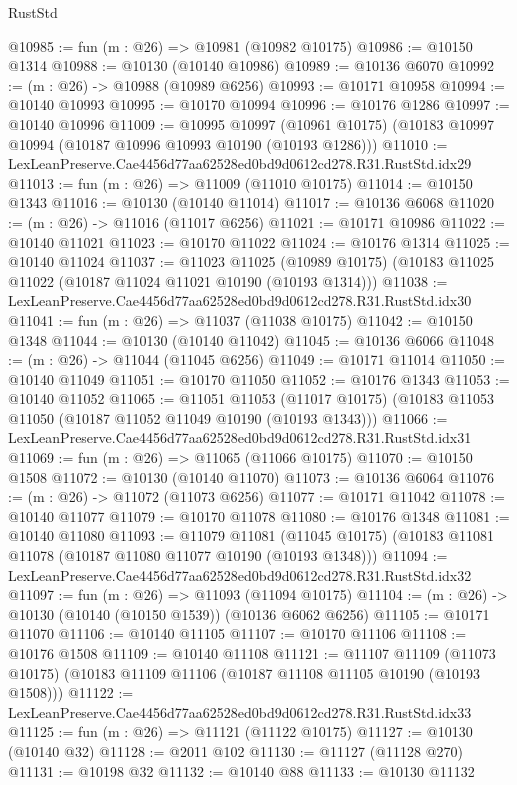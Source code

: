 \begin{lexlean}{RustStd}
\begin{coremodule}
@10985 := fun (m : @26) => @10981 (@10982 @10175)
@10986 := @10150 @1314
@10988 := @10130 (@10140 @10986)
@10989 := @10136 @6070
@10992 := (m : @26) -> @10988 (@10989 @6256)
@10993 := @10171 @10958
@10994 := @10140 @10993
@10995 := @10170 @10994
@10996 := @10176 @1286
@10997 := @10140 @10996
@11009 := @10995
    @10997
    (@10961 @10175)
    (@10183 @10997 @10994 (@10187 @10996 @10993 @10190 (@10193 @1286)))
@11010 := LexLeanPreserve.Cae4456d77aa62528ed0bd9d0612cd278.R31.RustStd.idx29
@11013 := fun (m : @26) => @11009 (@11010 @10175)
@11014 := @10150 @1343
@11016 := @10130 (@10140 @11014)
@11017 := @10136 @6068
@11020 := (m : @26) -> @11016 (@11017 @6256)
@11021 := @10171 @10986
@11022 := @10140 @11021
@11023 := @10170 @11022
@11024 := @10176 @1314
@11025 := @10140 @11024
@11037 := @11023
    @11025
    (@10989 @10175)
    (@10183 @11025 @11022 (@10187 @11024 @11021 @10190 (@10193 @1314)))
@11038 := LexLeanPreserve.Cae4456d77aa62528ed0bd9d0612cd278.R31.RustStd.idx30
@11041 := fun (m : @26) => @11037 (@11038 @10175)
@11042 := @10150 @1348
@11044 := @10130 (@10140 @11042)
@11045 := @10136 @6066
@11048 := (m : @26) -> @11044 (@11045 @6256)
@11049 := @10171 @11014
@11050 := @10140 @11049
@11051 := @10170 @11050
@11052 := @10176 @1343
@11053 := @10140 @11052
@11065 := @11051
    @11053
    (@11017 @10175)
    (@10183 @11053 @11050 (@10187 @11052 @11049 @10190 (@10193 @1343)))
@11066 := LexLeanPreserve.Cae4456d77aa62528ed0bd9d0612cd278.R31.RustStd.idx31
@11069 := fun (m : @26) => @11065 (@11066 @10175)
@11070 := @10150 @1508
@11072 := @10130 (@10140 @11070)
@11073 := @10136 @6064
@11076 := (m : @26) -> @11072 (@11073 @6256)
@11077 := @10171 @11042
@11078 := @10140 @11077
@11079 := @10170 @11078
@11080 := @10176 @1348
@11081 := @10140 @11080
@11093 := @11079
    @11081
    (@11045 @10175)
    (@10183 @11081 @11078 (@10187 @11080 @11077 @10190 (@10193 @1348)))
@11094 := LexLeanPreserve.Cae4456d77aa62528ed0bd9d0612cd278.R31.RustStd.idx32
@11097 := fun (m : @26) => @11093 (@11094 @10175)
@11104 := (m : @26) -> @10130 (@10140 (@10150 @1539)) (@10136 @6062 @6256)
@11105 := @10171 @11070
@11106 := @10140 @11105
@11107 := @10170 @11106
@11108 := @10176 @1508
@11109 := @10140 @11108
@11121 := @11107
    @11109
    (@11073 @10175)
    (@10183 @11109 @11106 (@10187 @11108 @11105 @10190 (@10193 @1508)))
@11122 := LexLeanPreserve.Cae4456d77aa62528ed0bd9d0612cd278.R31.RustStd.idx33
@11125 := fun (m : @26) => @11121 (@11122 @10175)
@11127 := @10130 (@10140 @32)
@11128 := @2011 @102
@11130 := @11127 (@11128 @270)
@11131 := @10198 @32
@11132 := @10140 @88
@11133 := @10130 @11132

\end{coremodule}
\end{lexlean}
